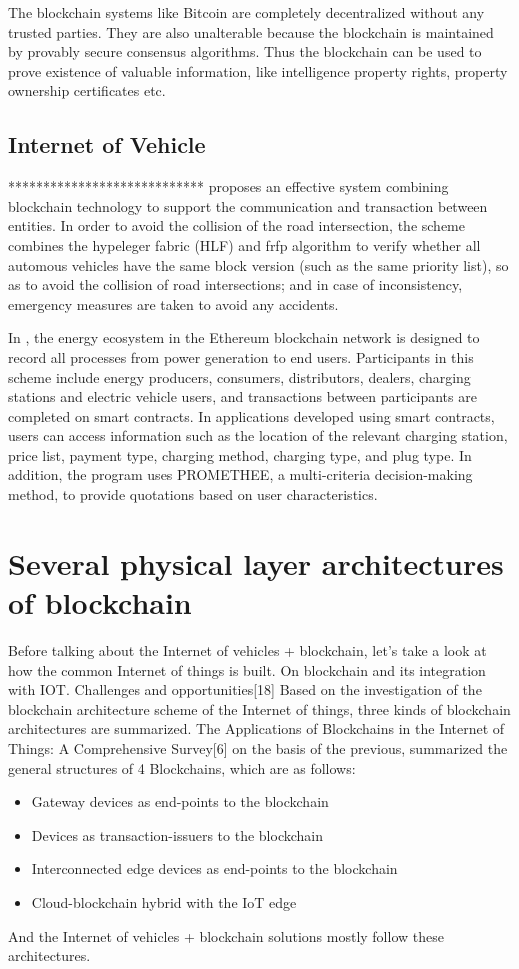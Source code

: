 The blockchain systems like Bitcoin are completely decentralized without any trusted parties. They are also unalterable because the blockchain is maintained by provably secure consensus algorithms. Thus the blockchain can be used to prove existence of valuable information, like intelligence property rights, property ownership certificates etc.

\subsection{Internet of Vehicle}
****************************
\cite{ref46} \cite{ref53} \cite{ref69} \cite{ref72}
\cite{ref77} proposes an effective system combining blockchain technology to support the communication and transaction between entities. In order to avoid the collision of the road intersection, the scheme combines the hypeleger fabric (HLF) and frfp algorithm to verify whether all automous vehicles have the same block version (such as the same priority list), so as to avoid the collision of road intersections; and in case of inconsistency, emergency measures are taken to avoid any accidents.

In \cite{ref80}, the energy ecosystem in the Ethereum blockchain network is designed to record all processes from power generation to end users. Participants in this scheme include energy producers, consumers, distributors, dealers, charging stations and electric vehicle users, and transactions between participants are completed on smart contracts. In applications developed using smart contracts, users can access information such as the location of the relevant charging station, price list, payment type, charging method, charging type, and plug type. In addition, the program uses PROMETHEE, a multi-criteria decision-making method, to provide quotations based on user characteristics.



\section{Several physical layer architectures of blockchain}\label{sec:problem}
Before talking about the Internet of vehicles + blockchain, let's take a look at how the common Internet of things is built. On blockchain and its integration with IOT. Challenges and opportunities[18]  Based on the investigation of the blockchain architecture scheme of the Internet of things, three kinds of blockchain architectures are summarized. The Applications of Blockchains in the Internet of Things: A Comprehensive Survey[6] on the basis of the previous, summarized the general structures of 4 Blockchains, which are as follows:
\begin{itemize}
	\item {Gateway devices as end-points to the blockchain}
	\item {Devices as transaction-issuers to the blockchain}
	\item {Interconnected edge devices as end-points to the blockchain}
	\item {Cloud-blockchain hybrid with the IoT edge}
\end{itemize}
And the Internet of vehicles + blockchain solutions mostly follow these architectures.
